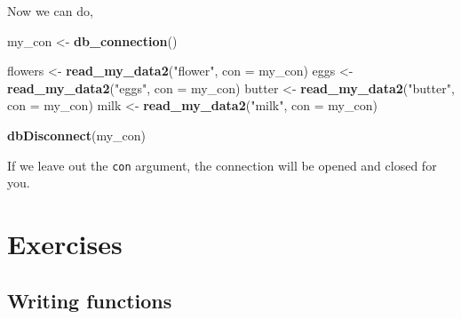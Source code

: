 \documentclass[]{book}
\newenvironment{Shaded}{\begin{snugshade}}{\end{snugshade}}
\newcommand{\DataTypeTok}[1]{\textcolor[rgb]{0.13,0.29,0.53}{#1}}
\newcommand{\KeywordTok}[1]{\textcolor[rgb]{0.13,0.29,0.53}{\textbf{#1}}}
\newcommand{\NormalTok}[1]{#1}
\newcommand{\StringTok}[1]{\textcolor[rgb]{0.31,0.60,0.02}{#1}}
\begin{document}
Now we can do,

\begin{Shaded}
\begin{Highlighting}[]
\NormalTok{my_con <-}\StringTok{ }\KeywordTok{db_connection}\NormalTok{()}

\NormalTok{flowers <-}\StringTok{ }\KeywordTok{read_my_data2}\NormalTok{(}\StringTok{"flower"}\NormalTok{, }\DataTypeTok{con =}\NormalTok{ my_con)}
\NormalTok{eggs <-}\StringTok{ }\KeywordTok{read_my_data2}\NormalTok{(}\StringTok{"eggs"}\NormalTok{, }\DataTypeTok{con =}\NormalTok{ my_con)}
\NormalTok{butter <-}\StringTok{ }\KeywordTok{read_my_data2}\NormalTok{(}\StringTok{"butter"}\NormalTok{, }\DataTypeTok{con =}\NormalTok{ my_con)}
\NormalTok{milk <-}\StringTok{ }\KeywordTok{read_my_data2}\NormalTok{(}\StringTok{"milk"}\NormalTok{, }\DataTypeTok{con =}\NormalTok{ my_con)}

\KeywordTok{dbDisconnect}\NormalTok{(my_con)}
\end{Highlighting}
\end{Shaded}

If we leave out the \texttt{con} argument, the connection will be opened and closed for you.

\hypertarget{exercises-3}{%
\section{Exercises}\label{exercises-3}}

\hypertarget{writing-functions}{%
\subsection{Writing functions}\label{writing-functions}}
\end{document}

